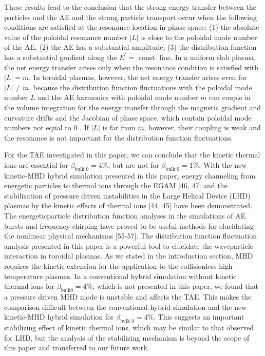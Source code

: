 \documentclass[10pt]{article}
\begin{document}
These results lead to the conclusion that the strong energy transfer between the particles and the $\mathrm{AE}$ and the strong particle transport occur when the following conditions are satisfied at the resonance location in phase space: (1) the absolute value of the poloidal resonance number $|L|$ is close to the poloidal mode number of the $\mathrm{AE}$, (2) the $\mathrm{AE}$ has a substantial amplitude, (3) the distribution function has a substantial gradient along the $E^{\prime}=$ const. line. In a uniform slab plasma, the net energy transfer arises only when the resonance condition is satisfied with $|L|=m$. In toroidal plasmas, however, the net energy transfer arises even for $|L| \neq m$, because the distribution function fluctuations with the poloidal mode number $L$ and the $\mathrm{AE}$ harmonics with poloidal mode number $m$ can couple in the volume integration for the energy transfer through the magnetic gradient and curvature drifts and the Jacobian of phase space, which contain poloidal mode numbers not equal to 0 . If $|L|$ is far from $m$, however, their coupling is weak and the resonance is not important for the distribution function fluctuations.

For the TAE investigated in this paper, we can conclude that the kinetic thermal ions are essential for $\beta_{\text {bulk } 0}=4 \%$, but are not for $\beta_{\text {bulk } 0}=1 \%$. With the new kinetic-MHD hybrid simulation presented in this paper, energy channeling from energetic particles to thermal ions through the EGAM [46, 47] and the stabilization of pressure driven instabilities in the Large Helical Device (LHD) plasmas by the kinetic effects of thermal ions [44, 45] have been demonstrated. The energeticparticle distribution function analyses in the simulations of AE bursts and frequency chirping have proved to be useful methods for elucidating the nonlinear physical mechanisms [55-57]. The distribution function fluctuation analysis presented in this paper is a powerful tool to elucidate the waveparticle interaction in toroidal plasmas. As we stated in the introduction section, MHD requires the kinetic extension for the application to the collisionless high-temperature plasmas. In a conventional hybrid simulation without kinetic thermal ions for $\beta_{\mathrm{bulk} 0}=4 \%$, which is not presented in this paper, we found that a pressure driven MHD mode is unstable and affects the TAE. This makes the comparison difficult between the conventional hybrid simulation and the new kinetic-MHD hybrid simulation for $\beta_{\text {bulk } 0}=4 \%$. This suggests an important stabilizing effect of kinetic thermal ions, which may be similar to that observed for LHD, but the analysis of the stabilizing mechanism is beyond the scope of this paper and transferred to our future work.
\end{document}

